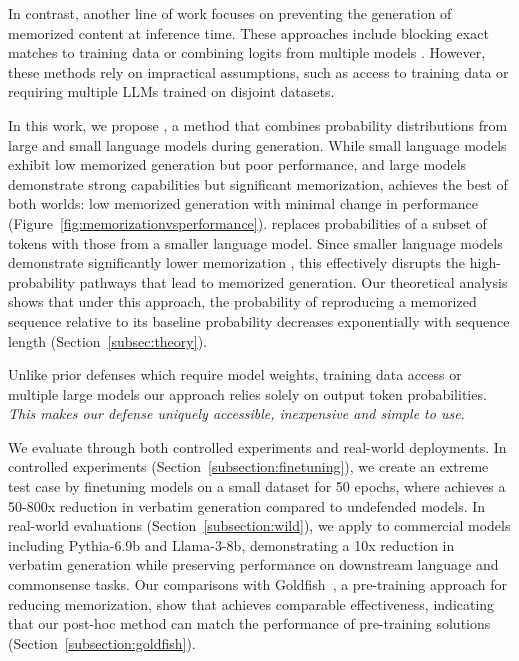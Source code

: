 In contrast, another line of work focuses on preventing the generation of memorized content at inference time. These approaches include blocking exact matches to training data \citep{ippolito2022preventing} or combining logits from multiple models \citep{abad2024copyright}. However, these methods rely on impractical assumptions, such as access to training data or requiring multiple LLMs trained on disjoint datasets.



In this work, we propose \sys, a method that combines probability distributions from large and small language models during generation. While small language models exhibit low memorized generation but poor performance, and large models demonstrate strong capabilities but significant memorization, \sys achieves the best of both worlds: low memorized generation with minimal change in performance (Figure~\ref{fig:memorizationvsperformance}). \sys replaces probabilities of a subset of tokens with those from a smaller language model. Since smaller language models demonstrate significantly lower memorization \citep{carlini2022quantifying, biderman2024emergent}, this effectively disrupts the high-probability pathways that lead to memorized generation. Our theoretical analysis shows that under this approach, the probability of reproducing a memorized sequence relative to its baseline probability decreases exponentially with sequence length (Section~\ref{subsec:theory}).


Unlike prior defenses which require model weights, training data access or multiple large models our approach relies solely on output token probabilities. \textit{This makes our defense uniquely accessible, inexpensive and simple to use.} 


We evaluate \sys through both controlled experiments and real-world deployments. In controlled experiments (Section~\ref{subsection:finetuning}), we create an extreme test case by finetuning models on a small dataset for 50 epochs, where \sys achieves a 50-800x reduction in verbatim generation compared to undefended models. In real-world evaluations (Section~\ref{subsection:wild}), we apply \sys to commercial models including Pythia-6.9b and Llama-3-8b, demonstrating a 10x reduction in verbatim generation while preserving performance on downstream language and commonsense tasks. Our comparisons with Goldfish~\citep{hans2024like}, a pre-training approach for reducing memorization, show that \sys achieves comparable effectiveness, indicating that our post-hoc method can match the performance of pre-training solutions (Section~\ref{subsection:goldfish}).

